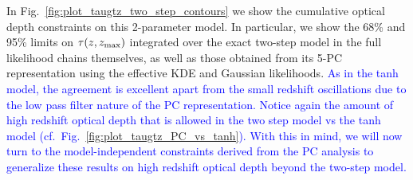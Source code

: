 \documentclass[prd,twocolumn,amsmath,amssymb,floatfix,superscriptaddress,nofootinbib]{revtex4-1}
\newcommand{\reffig}[1]{Fig.~\ref{fig:#1}}
\newcommand{\zmax}{z_{\rm max}}
\newcommand{\tauhi}{\tau_{\rm hi}}
\newcommand{\taulo}{\tau_{\rm lo}}
\newcommand{\wh}[1]{\textcolor{blue}{#1}}
\newcommand{\ch}[1]{\textcolor{red}{#1}}
\begin{document}
In Fig.~\ref{fig:plot_taugtz_two_step_contours} we show the cumulative optical depth constraints on this 2-parameter model. In particular, we show the 68\% and 95\% limits on $\tau(z, \zmax)$ integrated over the exact two-step model in the full likelihood chains themselves, as well as those obtained from its 5-PC representation using the effective KDE and Gaussian likelihoods.   
\wh{As in the tanh model, the agreement is excellent apart from the small redshift oscillations due to the low pass filter nature of the PC representation.  Notice again the amount of high redshift optical depth that is allowed in the two step model vs the tanh model (cf.~Fig.~\ref{fig:plot_taugtz_PC_vs_tanh}).}
%
\wh{
With this in mind, we will now turn to the model-independent constraints derived from the PC analysis to generalize these results on high redshift optical depth beyond the two-step model.}




\end{document}
